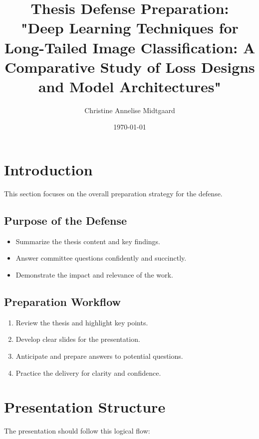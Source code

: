 \documentclass[a4paper,12pt]{article}
\begin{document}
\title{Thesis Defense Preparation: \\ \large "Deep Learning Techniques for Long-Tailed Image Classification: A Comparative Study of Loss Designs and Model Architectures"}
\author{Christine Annelise Midtgaard}
\date{\today}
\maketitle

\tableofcontents

\newpage

\section{Introduction}
This section focuses on the overall preparation strategy for the defense.

\subsection{Purpose of the Defense}
\begin{itemize}
    \item Summarize the thesis content and key findings.
    \item Answer committee questions confidently and succinctly.
    \item Demonstrate the impact and relevance of the work.
\end{itemize}

\subsection{Preparation Workflow}
\begin{enumerate}
    \item Review the thesis and highlight key points.
    \item Develop clear slides for the presentation.
    \item Anticipate and prepare answers to potential questions.
    \item Practice the delivery for clarity and confidence.
\end{enumerate}

\section{Presentation Structure}
The presentation should follow this logical flow:
\end{document}
